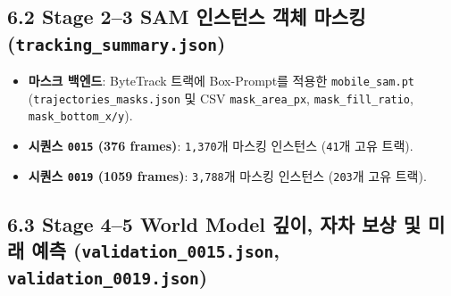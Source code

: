 \documentclass[10.5pt,a4paper]{article}
\begin{document}
\subsection{6.2 Stage 2--3 SAM 인스턴스 객체 마스킹 (\texttt{tracking\_\allowbreak{}summary.\allowbreak{}json})}
\begin{itemize}[leftmargin=1.5em,itemsep=2pt]
\item \textbf{마스크 백엔드}: ByteTrack 트랙에 Box-Prompt를 적용한 \texttt{mobile\_\allowbreak{}sam.\allowbreak{}pt} (\texttt{trajectories\_\allowbreak{}masks.\allowbreak{}json} 및 CSV \texttt{mask\_\allowbreak{}area\_\allowbreak{}px}, \texttt{mask\_\allowbreak{}fill\_\allowbreak{}ratio}, \texttt{mask\_\allowbreak{}bottom\_\allowbreak{}x/\allowbreak{}y}).
\item \textbf{시퀀스 \texttt{0015} (376 frames)}: \texttt{1,\allowbreak{}370}개 마스킹 인스턴스 (\texttt{41}개 고유 트랙).
\item \textbf{시퀀스 \texttt{0019} (1059 frames)}: \texttt{3,\allowbreak{}788}개 마스킹 인스턴스 (\texttt{203}개 고유 트랙).
\end{itemize}

\subsection{6.3 Stage 4--5 World Model 깊이, 자차 보상 및 미래 예측 (\texttt{validation\_\allowbreak{}0015.\allowbreak{}json}, \texttt{validation\_\allowbreak{}0019.\allowbreak{}json})}
\end{document}
